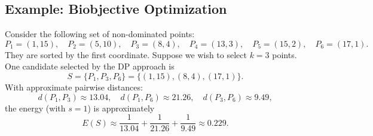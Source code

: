 \documentclass[11pt]{article}
\begin{document}
\subsection{Example: Biobjective Optimization}

Consider the following set of non-dominated points:
\[
P_1=(1,15),\quad P_2=(5,10),\quad P_3=(8,4),\quad P_4=(13,3),\quad P_5=(15,2),\quad P_6=(17,1).
\]
They are sorted by the first coordinate. Suppose we wish to select \(k=3\) points. One candidate selected by the DP approach is 
\[
S=\{P_1,P_3,P_6\}=\{(1,15),(8,4),(17,1)\}.
\]
With approximate pairwise distances:
\[
d(P_1,P_3)\approx 13.04,\quad d(P_1,P_6)\approx 21.26,\quad d(P_3,P_6)\approx 9.49,
\]
the energy (with \(s=1\)) is approximately
\[
E(S)\approx \frac{1}{13.04}+\frac{1}{21.26}+\frac{1}{9.49}\approx 0.229.
\]

\end{document}
